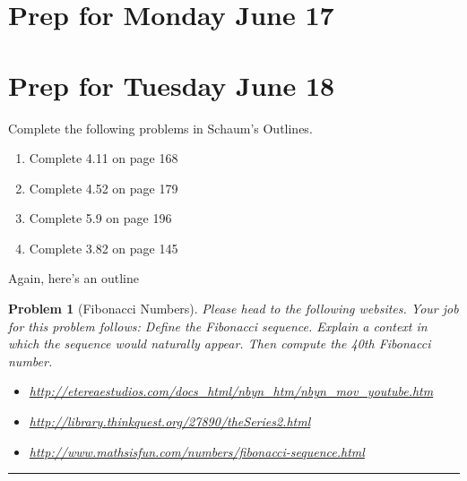 \documentclass[letterpaper,oneside]{book}%
\theoremstyle{plain}
\theoremstyle{box}
\theoremstyle{problem}
\newtheorem{problemnum}{Problem}[chapter]
\newtheorem*{hwenum*}{Home Work Practice}
\newenvironment{problem}[1][]{\begin{problemnum}[#1]}{\end{problemnum}\nopagebreak\hrule\bigskip}
\newenvironment{hw*}[1][]{\begin{hwenum*}[#1]}{\end{hwenum*}\nopagebreak\hrule\bigskip}
\begin{document}
\section{Prep for Monday June 17}

\section{Prep for Tuesday June 18}
\begin{hw*}
Complete the following problems in Schaum's Outlines. 
\begin{enumerate} 
 \item Complete 4.11 on page 168 %
 \item Complete 4.52 on page 179 %
 \item Complete 5.9  on page 196 %
\item Complete 3.82 on page 145 %
 \end{enumerate} 
\end{hw*}

Again, here's an outline
\begin{problem}[Fibonacci Numbers]
Please head to the following websites.  Your job for this problem follows: Define the Fibonacci sequence.  Explain a context in which the sequence would naturally appear. Then compute the 40th Fibonacci number. 
\begin{itemize}
 \item \href{http://etereaestudios.com/docs\_html/nbyn\_htm/nbyn\_mov\_youtube.htm}{http://etereaestudios.com/docs\_html/nbyn\_htm/nbyn\_mov\_youtube.htm}
 \item \href{http://library.thinkquest.org/27890/theSeries2.html}{http://library.thinkquest.org/27890/theSeries2.html}
 \item \href{http://www.mathsisfun.com/numbers/fibonacci-sequence.html}{http://www.mathsisfun.com/numbers/fibonacci-sequence.html}
\end{itemize}
\end{problem}
\end{document}
